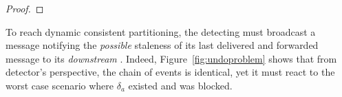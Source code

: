 \begin{proof}
\end{proof}

To reach dynamic consistent partitioning, the detecting \process must
broadcast a message notifying the \emph{possible} staleness of its
last delivered and forwarded message to its \emph{downstream}
\processes. Indeed, Figure~\ref{fig:undoproblem} shows that from
detector's perspective, the chain of events is identical, yet it must
react to the worst case scenario where $\delta_a$ existed and was
blocked.   

